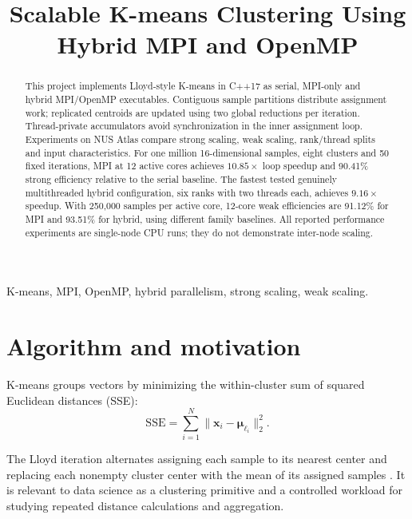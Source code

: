 \documentclass[conference,a4paper,10pt]{IEEEtran}
\title{Scalable K-means Clustering Using\\Hybrid MPI and OpenMP}
\author{\IEEEauthorblockN{Lai Xining}
\IEEEauthorblockA{DSA5208 Project 3\\5 November 2026}}
\begin{document}
\maketitle
\thispagestyle{plain}
\pagestyle{plain}
\raggedbottom


\begin{abstract}

This project implements Lloyd-style K-means in C++17 as serial, MPI-only and hybrid MPI/OpenMP executables. Contiguous sample partitions distribute assignment work; replicated centroids are updated using two global reductions per iteration. Thread-private accumulators avoid synchronization in the inner assignment loop. Experiments on NUS Atlas compare strong scaling, weak scaling, rank/thread splits and input characteristics. For one million 16-dimensional samples, eight clusters and 50 fixed iterations, MPI at 12 active cores achieves $10.85\times$ loop speedup and 90.41\% strong efficiency relative to the serial baseline. The fastest tested genuinely multithreaded hybrid configuration, six ranks with two threads each, achieves $9.16\times$ speedup. With 250,000 samples per active core, 12-core weak efficiencies are 91.12\% for MPI and 93.51\% for hybrid, using different family baselines. All reported performance experiments are single-node CPU runs; they do not demonstrate inter-node scaling.

\end{abstract}

\begin{IEEEkeywords}\raggedright K-means, MPI, OpenMP, hybrid parallelism, strong scaling, weak scaling.\end{IEEEkeywords}

\section{Algorithm and motivation}

\noindent K-means groups vectors by minimizing the within-cluster sum of squared Euclidean distances (SSE):
\begin{equation}\mathrm{SSE}=\sum_{i=1}^{N}\lVert\mathbf{x}_i-\boldsymbol{\mu}_{\ell_i}\rVert_2^2.\end{equation}

The Lloyd iteration alternates assigning each sample to its nearest center and replacing each nonempty cluster center with the mean of its assigned samples \cite{lloyd}. It is relevant to data science as a clustering primitive and a controlled workload for studying repeated distance calculations and aggregation.
\end{document}

